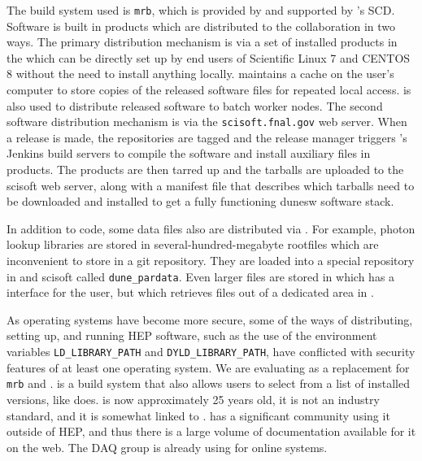 \documentclass[../main-v1.tex]{subfiles}
\begin{document}
The build system used is {\tt mrb}, which is provided by and supported by 's SCD.  Software is built in  products which are distributed to the collaboration in two ways.  The primary distribution mechanism is via a set of installed products in the  which can be directly set up by end users of Scientific Linux 7 and CENTOS 8 without the need to install anything locally.   maintains a cache on the user's computer to store copies of the released software files for repeated local access.   is also used to distribute released software to batch worker nodes.  The second software distribution mechanism is via the {\tt scisoft.fnal.gov} web server.  When a release is made, the repositories are tagged and the release manager triggers 's Jenkins build servers to compile the software and install auxiliary files in  products.  The  products are then tarred up and the tarballs are uploaded to the scisoft web server, along with a manifest file that describes which tarballs need to be downloaded and installed to get a fully
functioning dunesw software stack.

In addition to code, some data files also are distributed via .  For example, photon lookup libraries are stored in several-hundred-megabyte rootfiles which are inconvenient to store in a git repository.  They are loaded into a special repository in  and scisoft called {\tt dune\_pardata}.  Even larger files are stored in  which has a  interface for the user, but which retrieves files out of a dedicated area in .

As operating systems have become more secure, some of the ways of distributing, setting up, and running HEP software, such as the use of the environment variables {\tt LD\_LIBRARY\_PATH} and {\tt DYLD\_LIBRARY\_PATH}, have conflicted with security features of at least one operating system.  We are evaluating  as a replacement for {\tt mrb} and .   is a build system that also allows users to select from a list of installed versions, like  does.  is now approximately 25 years old, it is not an industry standard, and it is somewhat linked to .   has a significant community using it outside of HEP, and thus there is a large volume of documentation available for it on the web.  The DAQ group is already using  for online systems. 
\end{document}
